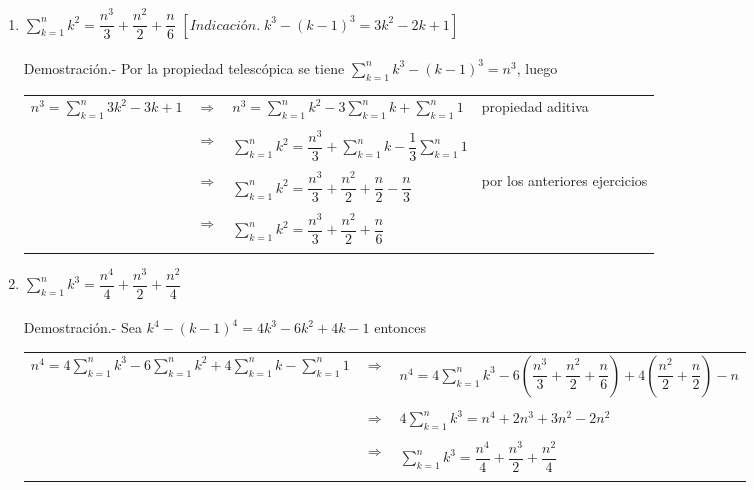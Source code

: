 \begin{enumerate}[\bfseries  1.]
\item $\displaystyle\sum_{k=1}^{n} k^2 = \dfrac{n^3}{3} + \dfrac{n^2}{2} + \dfrac{n}{6}$ $[Indicación. \; k^3 - (k-1)^3 = 3k^2 - 2k + 1]$\\\\
Demostración.- \;  Por la propiedad telescópica se tiene $\sum\limits_{k=1}^n k^3 - (k-1)^3 = n^3$, luego 
\begin{center}
\begin{tabular}{r c l l}
$n^3 = \sum\limits_{k=1}^n 3k^2-3k+1$&$\Rightarrow$&$n^3 = \sum\limits_{k=1}^n k^2 - 3 \sum\limits_{k=1}^n k + \sum\limits_{k=1}^n 1$&propiedad aditiva\\\\
&$\Rightarrow$&$\sum\limits_{k=1}^n k^2 = \dfrac{n^3}{3} + \sum\limits_{k=1}^n k - \dfrac{1}{3} \sum\limits_{k=1}^n 1$&\\\\
&$\Rightarrow$&$\sum\limits_{k=1}^n k^2 = \dfrac{n^3}{3} + \dfrac{n^2}{2} + \dfrac{n}{2} - \dfrac{n}{3}$&por los anteriores ejercicios\\\\
&$\Rightarrow$&$\sum\limits_{k=1}^n k^2 = \dfrac{n^3}{3} + \dfrac{n^2}{2} + \dfrac{n}{6}$&\\\\
\end{tabular}
\end{center}

\item $\displaystyle\sum_{k=1}^n k^3 = \dfrac{n^4}{4} + \dfrac{n^3}{2} + \dfrac{n^2}{4}$\\\\
Demostración.- \; Sea $k^4 - (k-1)^4 = 4k^3 - 6k^2 + 4k -1$ entonces  
\begin{center}
\begin{tabular}{r c l}
$n^4 = 4 \sum\limits_{k=1}^n k^3 - 6 \sum\limits_{k=1}^n k^2 + 4 \sum\limits_{k=1}^n k - \sum\limits_{k=1}^n 1$&$\Rightarrow$&$n^4 = 4 \sum\limits_{k=1}^n k^3 - 6 \left( \dfrac{n^3}{3} + \dfrac{n^2}{2} + \dfrac{n}{6} \right) + 4 \left( \dfrac{n^2}{2} + \dfrac{n}{2} \right) - n$\\\\
&$\Rightarrow$&$4 \sum\limits_{k=1}^n k^3 = n^4 + 2n^3 + 3n^2 - 2n^2$\\\\
&$\Rightarrow$&$\sum\limits_{k=1}^n k^3 = \dfrac{n^4}{4} + \dfrac{n^3}{2} + \dfrac{n^2}{4}$\\\\
\end{tabular}
\end{center}


\end{enumerate}
